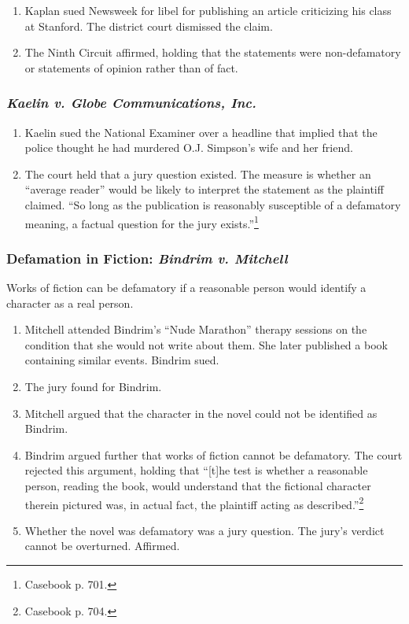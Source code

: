 \begin{enumerate}
    \item Kaplan sued Newsweek for libel for publishing an article criticizing his class 
    at Stanford. The district court dismissed the claim.
    \item The Ninth Circuit affirmed, holding that the statements were 
    non-defamatory or statements of opinion rather than of fact.
\end{enumerate}

\subsubsection{\emph{Kaelin v. Globe Communications, Inc.}}

\begin{enumerate}
    \item Kaelin sued the National Examiner over a headline that implied that 
    the police thought he had murdered O.J. Simpson's wife and her friend.
    \item The court held that a jury question existed. The measure is whether 
    an ``average reader'' would be likely to interpret the statement as the 
    plaintiff claimed. ``So long as the publication is reasonably susceptible 
    of a defamatory meaning, a factual question for the jury 
    exists.''\footnote{Casebook p. 701.}
\end{enumerate} 

\subsubsection{Defamation in Fiction: \emph{Bindrim v. Mitchell}}

Works of fiction can be defamatory if a reasonable person would identify a 
character as a real person.

\begin{enumerate}
    \item Mitchell attended Bindrim's ``Nude Marathon'' therapy sessions on 
    the condition that she would not write about them. She later published a 
    book containing similar events. Bindrim sued.  \item The jury found for 
    Bindrim.
    \item Mitchell argued that the character in the novel could not be 
    identified as Bindrim.
    \item Bindrim argued further that works of fiction cannot be defamatory.  
    The court rejected this argument, holding that ``[t]he test is whether a 
    reasonable person, reading the book, would understand that the fictional 
    character therein pictured was, in actual fact, the plaintiff acting as 
    described.''\footnote{Casebook p. 704.}
    \item Whether the novel was defamatory was a jury question. The jury's 
    verdict cannot be overturned. Affirmed.
\end{enumerate}

